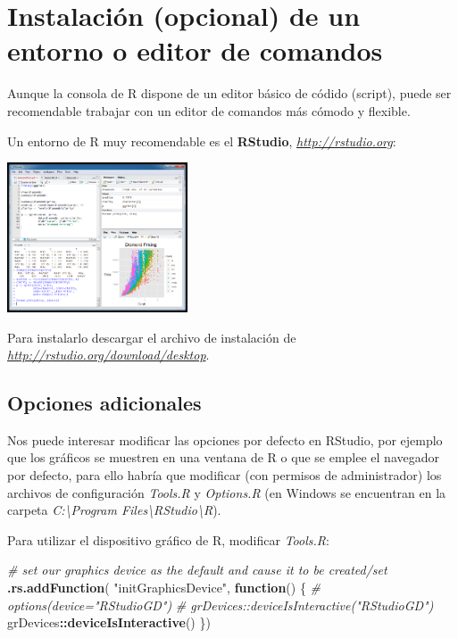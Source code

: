 \documentclass[
]{book}
\newenvironment{Shaded}{\begin{snugshade}}{\end{snugshade}}
\newcommand{\CommentTok}[1]{\textcolor[rgb]{0.56,0.35,0.01}{\textit{#1}}}
\newcommand{\ControlFlowTok}[1]{\textcolor[rgb]{0.13,0.29,0.53}{\textbf{#1}}}
\newcommand{\FunctionTok}[1]{\textcolor[rgb]{0.13,0.29,0.53}{\textbf{#1}}}
\newcommand{\NormalTok}[1]{#1}
\newcommand{\SpecialCharTok}[1]{\textcolor[rgb]{0.81,0.36,0.00}{\textbf{#1}}}
\newcommand{\StringTok}[1]{\textcolor[rgb]{0.31,0.60,0.02}{#1}}
\begin{document}
\section{Instalación (opcional) de un entorno o editor de comandos}\label{instalaciuxf3n-opcional-de-un-entorno-o-editor-de-comandos}

Aunque la consola de R dispone de un editor básico de códido (script),
puede ser recomendable trabajar con un editor de comandos más cómodo y
flexible.

Un entorno de R muy recomendable es el \textbf{RStudio},
\href{http://rstudio.org}{\emph{http://rstudio.org}}:

\includegraphics[width=0.4\textwidth,height=\textheight]{images/image8.png}

Para instalarlo descargar el archivo de instalación de
\href{http://rstudio.org/download/desktop}{\emph{http://rstudio.org/download/desktop}}.

\subsection{Opciones adicionales}\label{opciones-adicionales}

Nos puede interesar modificar las opciones por defecto en RStudio, por ejemplo que los gráficos se muestren en una ventana de R o que se emplee el navegador por defecto, para ello habría que modificar (con permisos de administrador) los archivos de configuración \emph{Tools.R} y \emph{Options.R}
(en Windows se encuentran en la carpeta \emph{C:\textbackslash Program Files\textbackslash RStudio\textbackslash R}).

Para utilizar el dispositivo gráfico de R, modificar \emph{Tools.R}:

\begin{Shaded}
\begin{Highlighting}[]
\CommentTok{\# set our graphics device as the default and cause it to be created/set}
\FunctionTok{.rs.addFunction}\NormalTok{( }\StringTok{"initGraphicsDevice"}\NormalTok{, }\ControlFlowTok{function}\NormalTok{()}
\NormalTok{\{}
   \CommentTok{\# options(device="RStudioGD")}
   \CommentTok{\# grDevices::deviceIsInteractive("RStudioGD")}
\NormalTok{  grDevices}\SpecialCharTok{::}\FunctionTok{deviceIsInteractive}\NormalTok{()}
\NormalTok{\})}
\end{Highlighting}
\end{Shaded}
\end{document}
